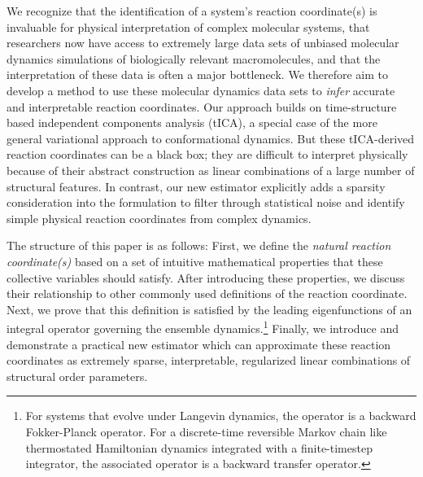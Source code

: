 \documentclass[aip, jcp, reprint, nolinenumbers, twocolumn, nobalancelastpage]{revtex4-1}
\begin{document}

We recognize that the identification of a system's reaction coordinate(s) is invaluable for physical interpretation of complex molecular systems, that researchers now have access to extremely large data sets of unbiased molecular dynamics simulations of biologically relevant macromolecules, and that the interpretation of these data is often a major bottleneck.\cite{lane2013milliseconds} We therefore aim to develop a method to use these molecular dynamics data sets to \emph{infer} accurate and interpretable reaction coordinates. Our approach builds on time-structure based independent components analysis (tICA), a special case of the more general variational approach to conformational dynamics.\cite{schwantes2013improvements, perez2013identification} But these tICA-derived reaction coordinates can be a black box; they are difficult to interpret physically because of their abstract construction as linear combinations of a large number of structural features. In contrast, our new estimator explicitly adds a sparsity consideration into the formulation to filter through statistical noise and identify simple physical reaction coordinates from complex dynamics.

The structure of this paper is as follows: First, we define the \emph{natural reaction coordinate(s)} based on a set of intuitive mathematical properties that these collective variables should satisfy. After introducing these properties, we discuss their relationship to other commonly used definitions of the reaction coordinate. Next, we prove that this definition is satisfied by the leading eigenfunctions of an integral operator governing the ensemble dynamics.\footnote{For systems that evolve under Langevin dynamics, the operator is a backward Fokker-Planck operator.\cite{coifman2008diffusion} For a discrete-time reversible Markov chain like thermostated Hamiltonian dynamics integrated with a finite-timestep integrator, the associated operator is a backward transfer operator.\cite{schutte2001transfer}} Finally, we introduce and demonstrate a practical new estimator which can approximate these reaction coordinates as extremely sparse, interpretable, regularized linear combinations of structural order parameters.

\end{document}
